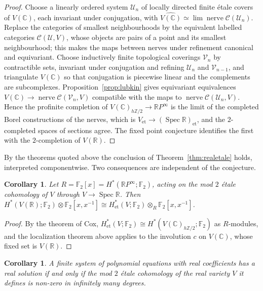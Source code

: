 \documentclass[11pt]{amsart}
\theoremstyle{plain}
\newtheorem{corollary}[theorem]{Corollary}
\theoremstyle{definition}
\numberwithin{equation}{section}
\newcommand{\Z}{\mathbb{Z}}
\newcommand{\R}{\mathbb{R}}
\newcommand{\C}{\mathbb{C}}
\newcommand{\F}{\mathbb{F}}
\newcommand{\RP}{\mathbb{R}P}
\DeclareMathOperator{\Spec}{Spec}
\begin{document}
\begin{proof}
Choose a linearly ordered system $\mathcal U_n$ of locally directed finite \'etale covers of $V(\C)$, each invariant under conjugation, with $\widehat{V(\C)}\simeq\lim\operatorname{nerve}\mathcal C(\mathcal U_n)$.
Replace the categories of smallest neighbourhoods by the equivalent labelled categories $\mathcal C(\mathcal U,V)$, whose objects are pairs of a point and its smallest neighbourhood; this makes the maps between nerves under refinement canonical and equivariant.
Choose inductively finite topological coverings $\mathcal V_n$ by contractible sets, invariant under conjugation and refining $\mathcal U_n$ and $\mathcal V_{n-1}$, and triangulate $V(\C)$ so that conjugation is piecewise linear and the complements are subcomplexes.
Proposition~\ref{prop:lubkin} gives equivariant equivalences $V(\C)\to\operatorname{nerve}\mathcal C(\mathcal V_n,V)$ compatible with the maps to $\operatorname{nerve}\mathcal C(\mathcal U_n,V)$.
Hence the profinite completion of $V(\C)_{h\Z/2}\to\RP^\infty$ is the limit of the completed Borel constructions of the nerves, which is $V_{\mathrm{et}}\to(\Spec\R)_{\mathrm{et}}$, and the $2$-completed spaces of sections agree.
The fixed point conjecture identifies the first with the $2$-completion of $V(\R)$.
\end{proof}

By the theorems quoted above the conclusion of Theorem~\ref{thm:realetale} holds, interpreted componentwise.
Two consequences are independent of the conjecture.

\begin{corollary}
Let $R=\F_2[x]=H^*(\RP^\infty;\F_2)$, acting on the mod $2$ \'etale cohomology of $V$ through $V\to\Spec\R$.
Then $H^*(V(\R);\F_2)\otimes\F_2[x,x^{-1}]\cong H^*_{\mathrm{et}}(V;\F_2)\otimes_R\F_2[x,x^{-1}]$.
\end{corollary}

\begin{proof}
By the theorem of Cox, $H^*_{\mathrm{et}}(V;\F_2)\cong H^*(V(\C)_{h\Z/2};\F_2)$ as $R$-modules, and the localization theorem above applies to the involution $c$ on $V(\C)$, whose fixed set is $V(\R)$.
\end{proof}

\begin{corollary}\label{cor:realpoints}
A finite system of polynomial equations with real coefficients has a real solution if and only if the mod $2$ \'etale cohomology of the real variety $V$ it defines is non-zero in infinitely many degrees.
\end{corollary}
\end{document}
